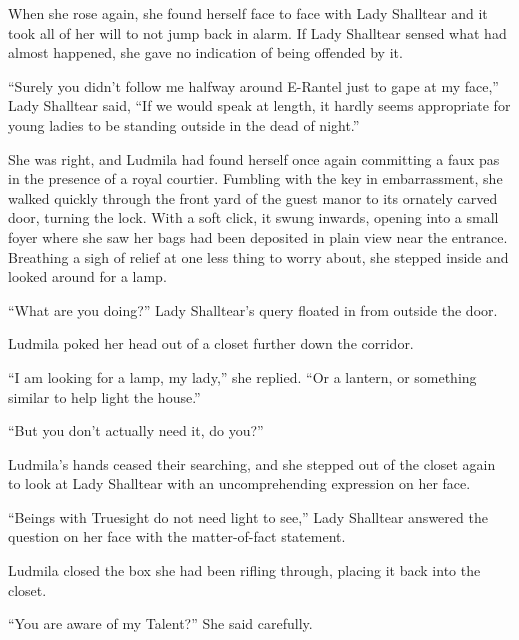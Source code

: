  

When she rose again, she found herself face to face with Lady Shalltear and it took all of her will to not jump back in alarm. If Lady Shalltear sensed what had almost happened, she gave no indication of being offended by it.

 

“Surely you didn't follow me halfway around E-Rantel just to gape at my face,” Lady Shalltear said, “If we would speak at length, it hardly seems appropriate for young ladies to be standing outside in the dead of night.”

 

She was right, and Ludmila had found herself once again committing a faux pas in the presence of a royal courtier. Fumbling with the key in embarrassment, she walked quickly through the front yard of the guest manor to its ornately carved door, turning the lock. With a soft click, it swung inwards, opening into a small foyer where she saw her bags had been deposited in plain view near the entrance. Breathing a sigh of relief at one less thing to worry about, she stepped inside and looked around for a lamp.

 

“What are you doing?” Lady Shalltear’s query floated in from outside the door.

 

Ludmila poked her head out of a closet further down the corridor.

 

“I am looking for a lamp, my lady,” she replied. “Or a lantern, or something similar to help light the house.”

 

“But you don’t actually need it, do you?”

 

Ludmila’s hands ceased their searching, and she stepped out of the closet again to look at Lady Shalltear with an uncomprehending expression on her face.

 

“Beings with Truesight do not need light to see,” Lady Shalltear answered the question on her face with the matter-of-fact statement.

 

Ludmila closed the box she had been rifling through, placing it back into the closet.

 

“You are aware of my Talent?” She said carefully.

